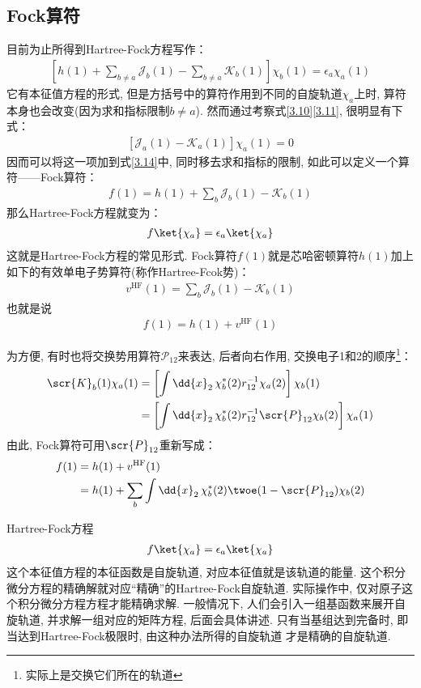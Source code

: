 \subsection{Fock算符}
目前为止所得到Hartree-Fock方程写作：
\begin{align}
\label{3.14}
\left[ h(1) + \sum_{b\neq a}\mathscr{J}_b(1) - \sum_{b\neq a}\mathscr{K}_b(1)   \right]\chi_b(1) = \epsilon_a\chi_a(1)
\end{align}
它有本征值方程的形式, 但是方括号中的算符作用到不同的自旋轨道$\chi_a$上时, 算符本身也会改变(因为求和指标限制$b\neq a$). 然而通过考察式\eqref{3.10}\eqref{3.11}, 很明显有下式：
\begin{align}
\left[ \mathscr{J}_a(1) - \mathscr{K}_a(1)  \right]\chi_a(1) = 0
\end{align}
因而可以将这一项加到式\eqref{3.14}中, 同时移去求和指标的限制, 如此可以定义一个算符——Fock算符：
\begin{align}
\label{3.16}
f(1) = h(1) + \sum_{b}\mathscr{J}_b(1) - \mathscr{K}_b(1)
\end{align}
那么Hartree-Fock方程就变为：
\begin{align}
\label{3.17}
f\ket{\chi_a} = \epsilon_a\ket{\chi_a}
\end{align}
这就是Hartree-Fock方程的常见形式. Fock算符$f(1)$就是芯哈密顿算符$h(1)$加上如下的有效单电子势算符(称作Hartree-Fcok势)：
\begin{align}
\label{3.18}
v^\mathrm{HF}(1) = \sum_b\mathscr{J}_b(1) - \mathscr{K}_b(1)
\end{align}
也就是说
\begin{align}
f(1) = h(1) + v^\mathrm{HF}(1)
\end{align}

为方便, 有时也将交换势用算符$\mathscr{P}_{12}$来表达, 后者向右作用, 交换电子1和2的顺序\footnote{
实际上是交换它们所在的轨道
}：
\begin{align}
\scr{K}_b(1)\chi_a(1) & = \left[ \int\dd{x}_2\,\chi_b^*(2)r_{12}^{-1}\chi_a(2) \right]\chi_b(1)\notag\\
& = \left[ \int\dd{x}_2\,\chi_b^*(2)r_{12}^{-1}\scr{P}_{12}\chi_b(2) \right]\chi_a(1)
\end{align}
由此, Fock算符可用$\scr{P}_{12}$重新写成：
\begin{align}
f(1) & = h(1) + v^\mathrm{HF}(1) \notag \\
     & = h(1) + \sum_b\int\dd{x}_2\,\chi_b^*(2)\twoe(1-\scr{P}_{12})\chi_b(2)
\end{align}

Hartree-Fock方程
\begin{align}
f\ket{\chi_a} = \epsilon_a\ket{\chi_a}
\end{align}
这个本征值方程的本征函数是自旋轨道, 对应本征值就是该轨道的能量. 这个积分微分方程的精确解就对应“精确”的Hartree-Fock自旋轨道. 实际操作中, 仅对原子这个积分微分方程方程才能精确求解. 一般情况下, 人们会引入一组基函数来展开自旋轨道, 并求解一组对应的矩阵方程, 后面会具体讲述. 只有当基组达到完备时, 即当达到Hartree-Fock极限时, 由这种办法所得的自旋轨道 才是精确的\hft 自旋轨道.

